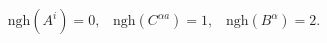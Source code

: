 \begin{equation*}
\mathrm{ngh}(A^{i})=0,\;\;\;\mathrm{ngh}(C^{\alpha a})=1,\;\;\;\mathrm{ngh}%
(B^{\alpha })=2.
\end{equation*}

